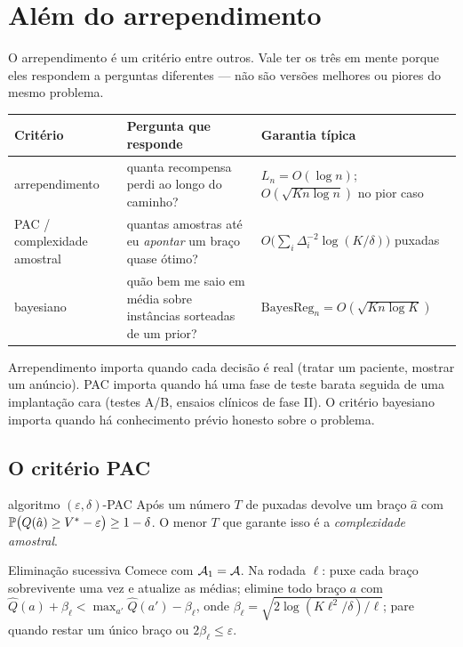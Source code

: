 \documentclass[11pt]{article}
\newcommand{\Qh}{\widehat{Q}}
\begin{document}
\section{Além do arrependimento}

O arrependimento é um critério entre outros. Vale ter os três em mente porque
eles respondem a perguntas diferentes --- não são versões melhores ou piores do
mesmo problema.

\begin{center}
\begin{tabular}{@{}p{3.0cm}p{5.0cm}p{6.2cm}@{}}
\toprule
\textbf{Critério} & \textbf{Pergunta que responde} & \textbf{Garantia típica} \\
\midrule
arrependimento & quanta recompensa perdi ao longo do caminho? &
  $L_n = O(\log n)$; $O(\sqrt{Kn\log n})$ no pior caso \\[0.3em]
PAC / complexidade amostral & quantas amostras até eu \emph{apontar} um braço
  quase ótimo? & $O\bigl(\sum_i \Delta_i^{-2}\log(K/\delta)\bigr)$ puxadas \\[0.3em]
bayesiano & quão bem me saio em média sobre instâncias sorteadas de um prior? &
  $\mathrm{BayesReg}_n = O(\sqrt{Kn\log K})$ \\
\bottomrule
\end{tabular}
\end{center}

\medskip
Arrependimento importa quando cada decisão é real (tratar um paciente, mostrar
um anúncio). PAC importa quando há uma fase de teste barata seguida de uma
implantação cara (testes A/B, ensaios clínicos de fase II). O critério
bayesiano importa quando há conhecimento prévio honesto sobre o problema.

\subsection*{O critério PAC}

\begin{defbox}{algoritmo $(\varepsilon,\delta)$-PAC}
Após um número $T$ de puxadas devolve um braço $\hat a$ com
$\mathbb{P}\bigl(Q(\hat a) \ge V^{*}-\varepsilon\bigr) \ge 1-\delta$. O menor $T$
que garante isso é a \emph{complexidade amostral}.
\end{defbox}

\begin{algbox}{Eliminação sucessiva}
Comece com $\mathcal{A}_1 = \mathcal{A}$. Na rodada $\ell$: puxe cada braço sobrevivente uma
vez e atualize as médias; elimine todo braço $a$ com
$\Qh(a) + \beta_\ell < \max_{a'}\Qh(a') - \beta_\ell$, onde
$\beta_\ell = \sqrt{2\log(K\ell^{2}/\delta)/\ell}$; pare quando restar um único
braço ou $2\beta_\ell \le \varepsilon$.
\end{algbox}
\end{document}
